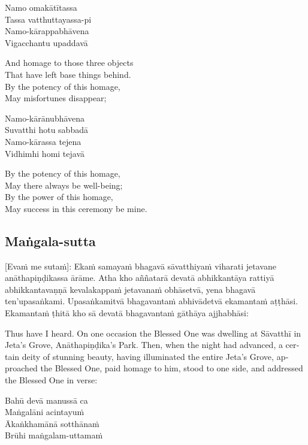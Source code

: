 Namo omakātītassa\\
Tassa vatthuttayassa-pi\\
Namo-kārappabhāvena\\
Vigacchantu upaddavā

\begin{english}
  And homage to those three objects\\
  That have left base things behind.\\
  By the potency of this homage,\\
  May misfortunes disappear;
\end{english}

Namo-kārānubhāvena\\
Suvatthi hotu sabbadā\\
Namo-kārassa tejena\\
Vidhimhi homi tejavā

\begin{english}
  By the potency of this homage,\\
  May there always be well-being;\\
  By the power of this homage,\\
  May success in this ceremony be mine.
\end{english}

\suttaRef{[Thai]}

\subsection{Maṅgala-sutta}
[Evaṁ me sutaṁ]: Ekaṁ samayaṁ bhagavā sāvatthiyaṁ viharati jetavane anāthapiṇḍikassa ārāme. Atha kho aññatarā devatā abhikkantāya rattiyā abhikkantavaṇṇā kevalakappaṁ jetavanaṁ obhāsetvā, yena bhagavā ten’upasaṅkami. Upasaṅkamitvā bhagavantaṁ abhivādetvā ekamantaṁ aṭṭhāsi. Ekamantaṁ ṭhitā kho sā devatā bhagavantaṁ gāthāya ajjhabhāsi:

\begin{english}
  Thus have I heard. On one occasion the Blessed One was dwelling at Sāvatthī in Jeta’s Grove, Anāthapiṇḍika’s Park. Then, when the night had advanced, a certain deity of stunning beauty, having illuminated the entire Jeta’s Grove, approached the Blessed One, paid homage to him, stood to one side, and addressed the Blessed One in verse:
\end{english}

Bahū devā manussā ca\\
Maṅgalāni acintayuṁ\\
Ākaṅkhamānā sotthānaṁ\\
Brūhi maṅgalam-uttamaṁ

